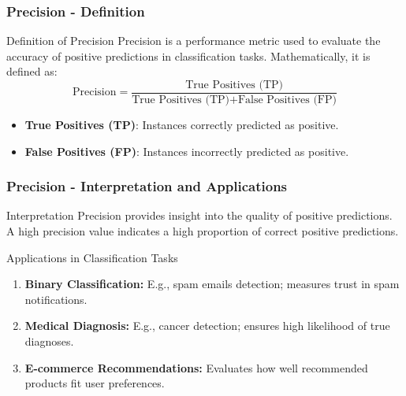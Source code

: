 \documentclass[aspectratio=169]{beamer}
\begin{document}
\begin{frame}[fragile]
    \frametitle{Precision - Definition}
    \begin{block}{Definition of Precision}
        Precision is a performance metric used to evaluate the accuracy of positive predictions in classification tasks. Mathematically, it is defined as:
        \begin{equation}
            \text{Precision} = \frac{\text{True Positives (TP)}}{\text{True Positives (TP)} + \text{False Positives (FP)}}
        \end{equation}
    \end{block}
    \begin{itemize}
        \item \textbf{True Positives (TP)}: Instances correctly predicted as positive.
        \item \textbf{False Positives (FP)}: Instances incorrectly predicted as positive.
    \end{itemize}
\end{frame}

\begin{frame}[fragile]
    \frametitle{Precision - Interpretation and Applications}
    \begin{block}{Interpretation}
        Precision provides insight into the quality of positive predictions. A high precision value indicates a high proportion of correct positive predictions.
    \end{block}
    
    \begin{block}{Applications in Classification Tasks}
        \begin{enumerate}
            \item \textbf{Binary Classification:} E.g., spam emails detection; measures trust in spam notifications.
            \item \textbf{Medical Diagnosis:} E.g., cancer detection; ensures high likelihood of true diagnoses.
            \item \textbf{E-commerce Recommendations:} Evaluates how well recommended products fit user preferences.
        \end{enumerate}
    \end{block}
\end{frame}
\end{document}
